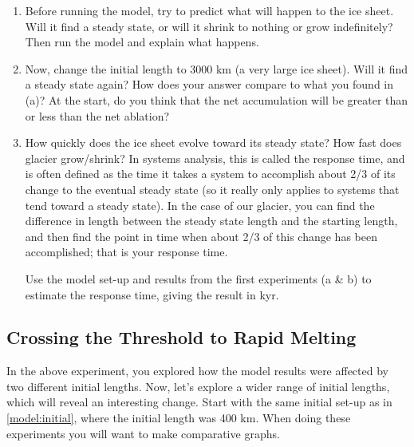 \documentclass[11pt,letterpaper]{article}
\begin{document}
\begin{enumerate}[label=(\alph*)]
\item Before running the model, try to predict what will happen to the ice sheet.  Will it find a steady state, or will it shrink to nothing or grow indefinitely?  Then run the model and explain what happens.

\item Now, change the initial length to 3000 km (a very large ice sheet).  Will it find a steady state again? How does your answer compare to what you found in (a)?  At the start, do you think that the net accumulation will be greater than or less than the net ablation?

\item How quickly does the ice sheet evolve toward its steady state? How fast does glacier grow/shrink?  In systems analysis, this is called the response time, and is often defined as the time it takes a system to accomplish about 2/3 of its change to the eventual steady state (so it really only applies to systems that tend toward a steady state). In the case of our glacier, you can find the difference in length between the steady state length and the starting length, and then find the point in time when about 2/3 of this change has been accomplished; that is your response time.

Use the model set-up and results from the first experiments (a \& b) to estimate the response time, giving the result in kyr.
\end{enumerate}

\subsection{Crossing the Threshold to Rapid Melting}

In the above experiment, you explored how the model results were affected by two different initial lengths. Now, let’s explore a wider range of initial lengths, which will reveal an interesting change. Start with the same initial set-up as in \ref{model:initial}, where the initial length was 400 km. When doing these experiments you will want to make comparative graphs.
\end{document}
